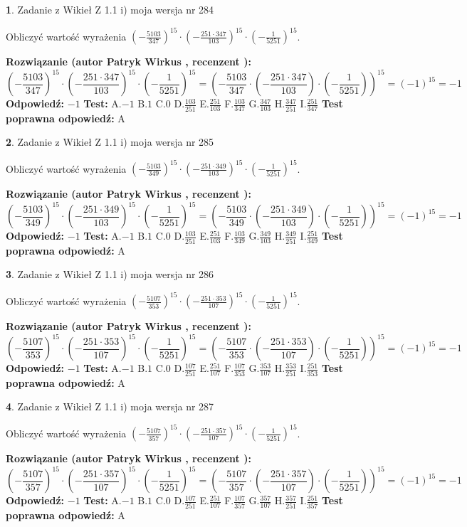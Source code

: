 \documentclass[12pt, a4paper]{article}
\theoremstyle{definition} %
\newtheorem{zad}{}
\newcommand{\zadStart}[1]{\begin{zad}#1\newline}
\newcommand{\zadStop}{\end{zad}}
\newcommand{\rozwStart}[2]{\noindent \textbf{Rozwiązanie (autor #1 , recenzent #2): }\newline}
\newcommand{\rozwStop}{\newline}
\newcommand{\odpStart}{\noindent \textbf{Odpowiedź:}\newline}
\newcommand{\odpStop}{\newline}
\newcommand{\testStart}{\noindent \textbf{Test:}\newline}
\newcommand{\testStop}{\newline}
\newcommand{\kluczStart}{\noindent \textbf{Test poprawna odpowiedź:}\newline}
\newcommand{\kluczStop}{\newline}
\begin{document}
\zadStart{Zadanie z Wikieł Z 1.1 i) moja wersja nr 284}

Obliczyć wartość wyrażenia $(-\frac{5103}{347})^{15} \cdot (-\frac{251 \cdot 347}{103})^{15} \cdot (-\frac{1}{5251})^{15}$.
\zadStop
\rozwStart{Patryk Wirkus}{}
$$(-\frac{5103}{347})^{15} \cdot (-\frac{251 \cdot 347}{103})^{15} \cdot (-\frac{1}{5251})^{15} = (-\frac{5103}{347} \cdot (-\frac{251 \cdot 347}{103}) \cdot (-\frac{1}{5251}))^{15} = (-1)^{15} = -1$$
\rozwStop
\odpStart
$-1$
\odpStop
\testStart
A.$-1$ B.$1$ C.$0$ D.$\frac{103}{251}$ E.$\frac{251}{103}$
F.$\frac{103}{347}$ G.$\frac{347}{103}$
H.$\frac{347}{251}$
I.$\frac{251}{347}$
\testStop
\kluczStart
A
\kluczStop



\zadStart{Zadanie z Wikieł Z 1.1 i) moja wersja nr 285}

Obliczyć wartość wyrażenia $(-\frac{5103}{349})^{15} \cdot (-\frac{251 \cdot 349}{103})^{15} \cdot (-\frac{1}{5251})^{15}$.
\zadStop
\rozwStart{Patryk Wirkus}{}
$$(-\frac{5103}{349})^{15} \cdot (-\frac{251 \cdot 349}{103})^{15} \cdot (-\frac{1}{5251})^{15} = (-\frac{5103}{349} \cdot (-\frac{251 \cdot 349}{103}) \cdot (-\frac{1}{5251}))^{15} = (-1)^{15} = -1$$
\rozwStop
\odpStart
$-1$
\odpStop
\testStart
A.$-1$ B.$1$ C.$0$ D.$\frac{103}{251}$ E.$\frac{251}{103}$
F.$\frac{103}{349}$ G.$\frac{349}{103}$
H.$\frac{349}{251}$
I.$\frac{251}{349}$
\testStop
\kluczStart
A
\kluczStop



\zadStart{Zadanie z Wikieł Z 1.1 i) moja wersja nr 286}

Obliczyć wartość wyrażenia $(-\frac{5107}{353})^{15} \cdot (-\frac{251 \cdot 353}{107})^{15} \cdot (-\frac{1}{5251})^{15}$.
\zadStop
\rozwStart{Patryk Wirkus}{}
$$(-\frac{5107}{353})^{15} \cdot (-\frac{251 \cdot 353}{107})^{15} \cdot (-\frac{1}{5251})^{15} = (-\frac{5107}{353} \cdot (-\frac{251 \cdot 353}{107}) \cdot (-\frac{1}{5251}))^{15} = (-1)^{15} = -1$$
\rozwStop
\odpStart
$-1$
\odpStop
\testStart
A.$-1$ B.$1$ C.$0$ D.$\frac{107}{251}$ E.$\frac{251}{107}$
F.$\frac{107}{353}$ G.$\frac{353}{107}$
H.$\frac{353}{251}$
I.$\frac{251}{353}$
\testStop
\kluczStart
A
\kluczStop



\zadStart{Zadanie z Wikieł Z 1.1 i) moja wersja nr 287}

Obliczyć wartość wyrażenia $(-\frac{5107}{357})^{15} \cdot (-\frac{251 \cdot 357}{107})^{15} \cdot (-\frac{1}{5251})^{15}$.
\zadStop
\rozwStart{Patryk Wirkus}{}
$$(-\frac{5107}{357})^{15} \cdot (-\frac{251 \cdot 357}{107})^{15} \cdot (-\frac{1}{5251})^{15} = (-\frac{5107}{357} \cdot (-\frac{251 \cdot 357}{107}) \cdot (-\frac{1}{5251}))^{15} = (-1)^{15} = -1$$
\rozwStop
\odpStart
$-1$
\odpStop
\testStart
A.$-1$ B.$1$ C.$0$ D.$\frac{107}{251}$ E.$\frac{251}{107}$
F.$\frac{107}{357}$ G.$\frac{357}{107}$
H.$\frac{357}{251}$
I.$\frac{251}{357}$
\testStop
\kluczStart
A
\kluczStop
\end{document}
